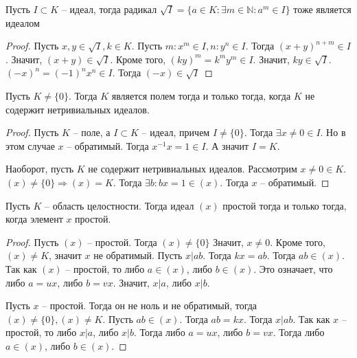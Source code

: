 \documentclass{article}
\begin{document}
\begin{statement}
    Пусть $I \subset K$ -- идеал, тогда радикал $\sqrt{I} = \{a \in K: \exists m \in \mathbb{N}: a^m \in I\}$ тоже
    является идеалом
\end{statement}

\begin{proof}
    Пусть $x, y \in \sqrt{I}, k \in K$. Пусть $m: x^m \in I, n: y^n \in I$.
    Тогда $(x+y)^{n + m} \in I$. Значит, $(x+y) \in \sqrt{I}$. Кроме того, $(ky)^m = k^my^m \in I$. Значит, $ky \in
    \sqrt{I}$. $(-x)^n = (-1)^nx^n \in I$. Тогда $(-x) \in \sqrt{I}$
\end{proof}

\begin{statement}
    Пусть $K \neq \{0\}$. Тогда $K$ является полем тогда и только тогда, когда $K$ не содержит нетривиальных идеалов.
\end{statement}

\begin{proof}
    Пусть $K$ -- поле, а $I \subset K$ -- идеал, причем $I \neq \{0\}$. Тогда $\exists x \neq 0 \in I$. Но в этом случае
    $x$ -- обратимый. Тогда $x^{-1}x = 1 \in I$. А значит $I = K$.

    Наоборот, пусть $K$ не содержит нетривиальных идеалов. Рассмотрим $x \neq 0 \in K$. $(x) \neq \{0\} \Rightarrow (x) =
    K$. Тогда $\exists b: bx = 1 \in (x)$. Тогда $x$ -- обратимый.
\end{proof}

\begin{statement}
    Пусть $K$ -- область целостности. Тогда идеал $(x)$ простой тогда и только тогда, когда элемент $x$ простой.
\end{statement}

\begin{proof}
    Пусть $(x)$ -- простой. Тогда $(x) \neq \{0\}$ Значит, $x \neq 0$. Кроме того, $(x) \neq K$, значит $x$ не
    обратимый. Пусть $x | ab$. Тогда $kx = ab$. Тогда $ab \in (x)$. Так как $(x)$ -- простой, то либо $a \in (x)$, либо
    $b \in (x)$. Это означает, что либо $a = ux$, либо $b = vx$. Значит, $x | a$, либо $x | b$.

    Пусть $x$ -- простой. Тогда он не ноль и не обратимый, тогда $(x) \neq \{0\}, (x) \neq K$. Пусть $ab \in (x)$. Тогда
    $ab = kx$. Тогда $x | ab$. Так как $x$ -- простой, то либо $x | a$, либо $x | b$. Тогда либо $a = ux$, либо $b =
    vx$. Тогда либо $a \in (x)$, либо $b \in (x)$.
\end{proof}
\end{document}
